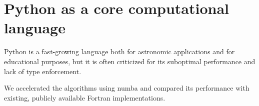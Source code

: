 \section{Python as a core computational language}

Python is a fast-growing language both for astronomic applications\cite{2015arXiv150703989M} and for educational purposes\cite{guo2014python}, but it is often criticized for its suboptimal performance and lack of type enforcement.

We accelerated the algorithms using numba and compared its performance with existing, publicly available Fortran implementations.